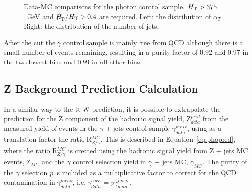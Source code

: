 \begin{figure}[h]
\begin{center}
\caption{\label{fig:photon_plots} Data-MC comparisons for the photon control sample. $\mbox{$H_\text{T}$} > 375$~GeV and $\mht/\scalht>0.4$ are required. Left: the distribution of $\alpha_{T}$. Right: the distribution of the number of jets.}
\end{center}
\end{figure}

After the \alt cut the $\gamma$ control sample is mainly free from QCD although there is a small number of events remaining, resulting in a purity factor of 0.92 and 0.97 in the two lowest bins and 0.99 in all other bins.

\subsection{Z Background Prediction Calculation}

In a similar way to the t$\bar{\textrm{t}}$-W prediction, it is possible to extrapolate the prediction for the Z component of the hadronic signal yield, Z$^{pred}_{data}$ from the measured yield of events in the $\gamma$ + jets control sample $\gamma^{mess}_{data}$, using as a translation factor the ratio R$^{MC}_{Z/\gamma}$. This is described in Equation~\ref{eq:phopred}, where the ratio R$^{MC}_{Z/\gamma}$ is created using the hadronic signal yield from Z + jets MC events, Z$_{MC}$ and the $\gamma$ control selection yield in $\gamma$ + jets MC, $\gamma_{MC}$. The purity of the $\gamma$ selection $p$ is included as a multiplicative factor to correct for the QCD contamination in $\gamma^{meas}_{data}$, i.e. $\gamma^{corr}_{data}$ = $p \gamma^{meas}_{data}$.

